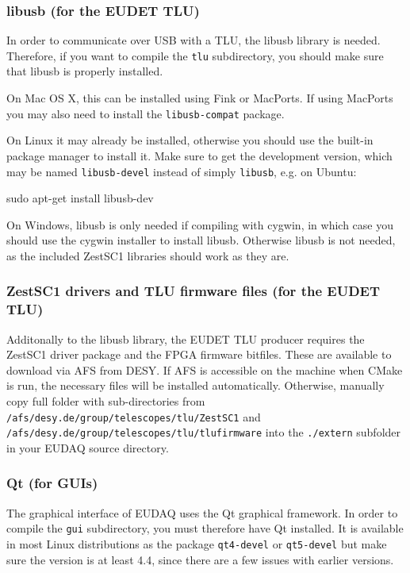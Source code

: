 \subsubsection{libusb (for the EUDET TLU)}
In order to communicate over USB with a \gls{TLU}, the libusb library is needed.
Therefore, if you want to compile the \texttt{tlu} subdirectory, you should make sure that libusb is properly installed.

On Mac OS X, this can be installed using Fink or MacPorts.
If using MacPorts you may also need to install the \texttt{libusb-compat} package.

On Linux it may already be installed,
otherwise you should use the built-in package manager to install it.
Make sure to get the development version, which may be named \texttt{libusb-devel} instead of simply \texttt{libusb}, e.g. on Ubuntu: 
\begin{listing}[mybash]
sudo apt-get install libusb-dev 
\end{listing}

On Windows, libusb is only needed if compiling with cygwin,
in which case you should use the cygwin installer to install libusb.
Otherwise libusb is not needed, as the included ZestSC1 libraries should work as they are.

\subsubsection{ZestSC1 drivers and TLU firmware files (for the EUDET TLU)}
Additonally to the libusb library, the EUDET \gls{TLU} producer requires the
ZestSC1 driver package and the FPGA firmware bitfiles. 
These are available to download via AFS from DESY. 
If AFS is accessible on the machine when CMake is run, the necessary files will be installed
automatically.
Otherwise, manually copy full folder with sub-directories from
\texttt{/afs/desy.de/group/telescopes/tlu/ZestSC1} and
\texttt{/afs/desy.de/group/telescopes/tlu/tlufirmware} into the
\texttt{./extern} subfolder in your EUDAQ source directory.


\subsubsection{Qt (for GUIs)}
The graphical interface of EUDAQ uses the Qt graphical framework.
In order to compile the \texttt{gui} subdirectory, you must therefore have Qt installed.
It is available in most Linux distributions as the package \texttt{qt4-devel} or  \texttt{qt5-devel}
but make sure the version is at least 4.4, since there are a few issues with earlier versions.

